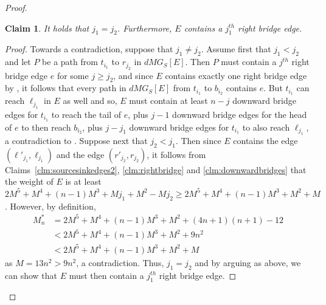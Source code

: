 \documentclass[a4paper,11pt]{article}
\theoremstyle{plain}
\newtheorem{claim}[theorem]{Claim}
\newtheorem{identification rule}{Identification Rule}
\theoremstyle{definition}
\theoremstyle{remark}
\newenvironment{claimproof}{\begin{proof}\renewcommand{\qedsymbol}{\claimqed}}{\end{proof}\renewcommand{\qedsymbol}{\plainqed}}
\let\plainqed\qedsymbol
\newcommand{\claimqed}{$\lrcorner$}
\begin{document}
\begin{proof}
\begin{claim}
\label{clm:j1=j2}
It holds that $j_1 = j_2$. Furthermore, $E$ contains a $j_1^{th}$ right bridge edge.
\end{claim}

\begin{claimproof}
Towards a contradiction, suppose that $j_1 \neq j_2$.
Assume first that $j_1 < j_2$ and let $P$ be a path from $t_{i_1}$ to $r_{j_2}$ in $dMG_S[E]$. Then $P$ must contain a $j^{th}$ right bridge edge $e$ for some $j \geq j_2$, and since $E$ contains exactly one right bridge edge by , it follows that every path in $dMG_S[E]$ from $t_{i_1}$ to $b_{i_2}$ contains $e$. But $t_{i_1}$ can reach $\ell_{j_1}$ in $E$ as well and so, $E$ must contain at least $n-j$ downward bridge edges for $t_{i_1}$ to reach the tail of $e$, plus $j -1$ downward bridge edges for the head of $e$ to then reach $b_{i_2}$, plus $j-j_1$ downward bridge edges for $t_{i_1}$ to also reach $\ell_{j_1}$, a contradiction to . Suppose next that $j_2 < j_1$. Then since $E$ contains the edge $(\ell'_{j_1},\ell_{j_1})$ and the edge $(r'_{j_2},r_{j_2})$, it follows from Claims~\ref{clm:sourcesinkedges2}, \ref{clm:rightbridge} and \ref{clm:downwardbridges} that the weight of $E$ is at least $2M^5 + M^4 + (n-1)M^3 + Mj_1 + M^2 - Mj_2 \geq 2M^5 + M^4 + (n-1)M^3 + M^2 + M$. However, by definition,
\begin{equation*}
\begin{split}
M_n^* &= 2M^5 + M^4 + (n-1)M^3 + M^2 + (4n+1)(n+1) - 12\\
& <  2M^5 + M^4 + (n-1)M^3 + M^2 + 9n^2\\
& < 2M^5 + M^4 + (n-1)M^3 + M^2 + M
\end{split}
\end{equation*}
as $M = 13n^2 > 9n^2$, a contradiction. Thus, $j_1 = j_2$ and by arguing as above, we can show that $E$ must then contain a $j_1^{th}$ right bridge edge.
\end{claimproof}


\end{proof}
\end{document}
